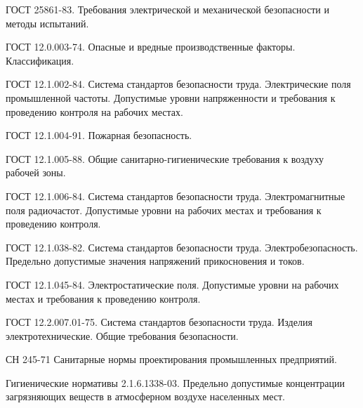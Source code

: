  ГОСТ 25861-83.
                                Требования электрической и механической
                                безопасности и методы испытаний.

   ГОСТ 12.0.003-74.
                                Опасные и вредные производственные факторы.
                                Классификация.

   ГОСТ 12.1.002-84.
                                Система стандартов безопасности труда.
                                Электрические поля промышленной частоты.
                                Допустимые уровни напряженности и требования
                                к проведению контроля на рабочих местах.

   ГОСТ 12.1.004-91.
                                Пожарная безопасность.

   ГОСТ 12.1.005-88.
                                Общие санитарно-гигиенические требования
                                к воздуху рабочей зоны.

   ГОСТ 12.1.006-84.
                                Система стандартов безопасности труда.
                                Электромагнитные поля радиочастот.
                                Допустимые уровни на рабочих местах и требования
                                к проведению контроля.

   ГОСТ 12.1.038-82.
                                Система стандартов безопасности труда.
                                Электробезопасность. Предельно допустимые
                                значения напряжений прикосновения и токов.

   ГОСТ 12.1.045-84.
                                Электростатические поля. Допустимые уровни на
                                рабочих местах и требования к проведению контроля.

    ГОСТ 12.2.007.01-75.
                                    Система стандартов безопасности труда.
                                    Изделия электротехнические.
                                    Общие требования безопасности.

   СН 245-71
                                    Санитарные нормы проектирования промышленных
                                    предприятий.

  Гигиенические нормативы 2.1.6.1338-03.
                                        Предельно допустимые концентрации загрязняющих
                                        веществ в атмосферном воздухе населенных мест.
